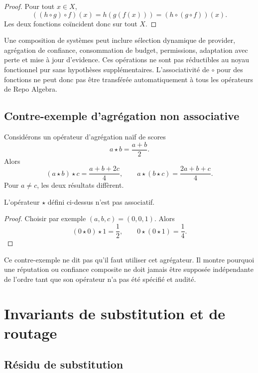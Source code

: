 \begin{proof}
Pour tout $x\in X$,
\[
((h\circ g)\circ f)(x)=h(g(f(x)))=(h\circ(g\circ f))(x).
\]
Les deux fonctions coïncident donc sur tout $X$.
\end{proof}

\begin{limitation}
Une composition de systèmes peut inclure sélection dynamique de provider, agrégation de confiance, consommation de budget, permissions, adaptation avec perte et mise à jour d'evidence. Ces opérations ne sont pas réductibles au noyau fonctionnel pur sans hypothèses supplémentaires. L'associativité de $\circ$ pour des fonctions ne peut donc pas être transférée automatiquement à tous les opérateurs de Repo Algebra.
\end{limitation}

\section{Contre-exemple d'agrégation non associative}

Considérons un opérateur d'agrégation naïf de scores
\[
a\star b=\frac{a+b}{2}.
\]
Alors
\[
(a\star b)\star c=\frac{a+b+2c}{4},
\qquad
a\star(b\star c)=\frac{2a+b+c}{4}.
\]
Pour $a\neq c$, les deux résultats diffèrent.

\begin{proposition}
L'opérateur $\star$ défini ci-dessus n'est pas associatif.
\end{proposition}

\begin{proof}
Choisir par exemple $(a,b,c)=(0,0,1)$. Alors
\[
(0\star0)\star1=\frac12,
\qquad
0\star(0\star1)=\frac14.
\]
\end{proof}

\begin{observation}
Ce contre-exemple ne dit pas qu'il faut utiliser cet agrégateur. Il montre pourquoi une réputation ou confiance composite ne doit jamais être supposée indépendante de l'ordre tant que son opérateur n'a pas été spécifié et audité.
\end{observation}

\chapter{Invariants de substitution et de routage}

\section{Résidu de substitution}

